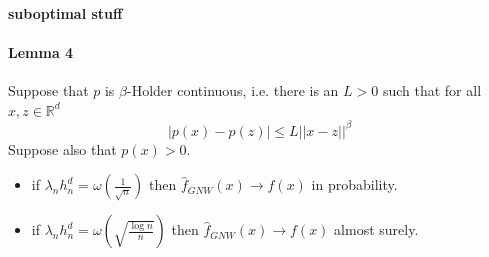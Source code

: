 \documentclass{article}
\begin{document}
\paragraph{suboptimal stuff} \paragraph{Lemma 4} Suppose that $p$ is $\beta$-Holder continuous, i.e. there is an $L>0$ such that for all $x,z\in\mathbb{R}^d$
\begin{equation*}
    |p(x)-p(z)|\leq L||x-z||^{\beta}
\end{equation*}
Suppose also that $p(x)>0$.
\begin{itemize}
    \item if $\lambda_nh_n^d=\omega(\frac{1}{\sqrt{n}})$
    then $\hat{f}_{GNW}(x)\rightarrow f(x)$ in probability.
    \item if $\lambda_nh_n^d=\omega(\sqrt{\frac{\log{n}}{n}})$
    then $\hat{f}_{GNW}(x)\rightarrow f(x)$ almost surely.
\end{itemize}
\end{document}
